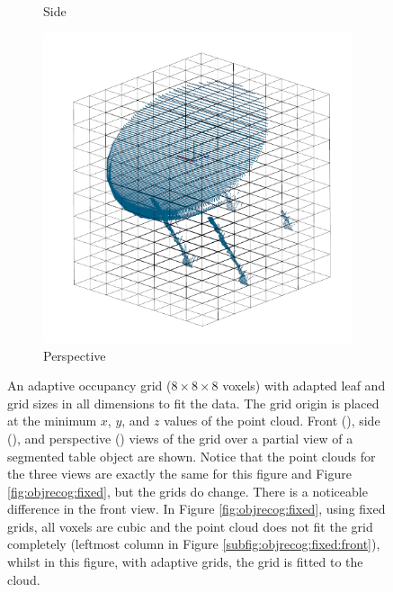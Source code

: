 \begin{figure}[!htb]
\begin{subfigure}{0.325\textwidth}
		\caption{Side}
		\label{subfig:objrecog:adaptive:side}
	\end{subfigure}
	\hfill
	\begin{subfigure}{0.325\textwidth}
		\centering
		\includegraphics[width=\linewidth]{Figures/ObjRecog/adaptive_persp}
		\caption{Perspective}
		\label{subfig:objrecog:adaptive:persp}
	\end{subfigure}
	\hfill
	\caption{An adaptive occupancy grid ($8\times8\times8$ voxels) with adapted leaf and grid sizes in all dimensions to fit the data. The grid origin is placed at the minimum $x$, $y$, and $z$ values of the point cloud. Front (), side (), and perspective () views of the grid over a partial view of a segmented table object are shown. Notice that the point clouds for the three views are exactly the same for this figure and Figure \ref{fig:objrecog:fixed}, but the grids do change. There is a noticeable difference in the	front view. In Figure \ref{fig:objrecog:fixed}, using fixed grids, all voxels are cubic and the point cloud does not fit the grid completely (leftmost column in Figure \ref{subfig:objrecog:fixed:front}), whilst in this figure, with adaptive grids, the grid is fitted to the cloud.}
	\label{fig:objrecog:adaptive}
\end{figure}

